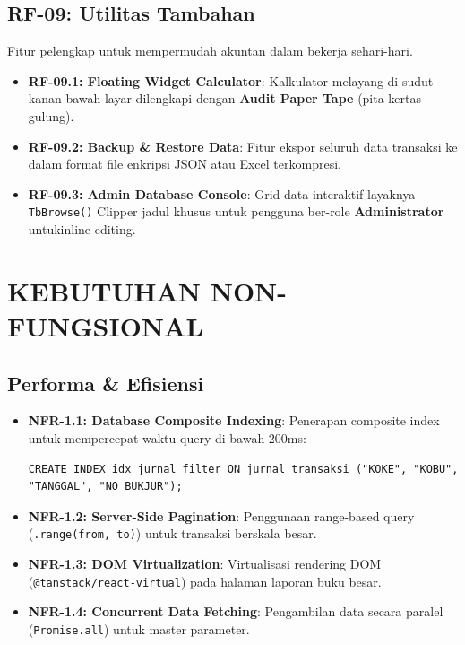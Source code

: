 \documentclass[11pt,a4paper]{article}
\begin{document}
\subsection{RF-09: Utilitas Tambahan}
Fitur pelengkap untuk mempermudah akuntan dalam bekerja sehari-hari.
\begin{itemize}
    \item \textbf{RF-09.1: Floating Widget Calculator}: Kalkulator melayang di sudut kanan bawah layar dilengkapi dengan \textbf{Audit Paper Tape} (pita kertas gulung).
    \item \textbf{RF-09.2: Backup \& Restore Data}: Fitur ekspor seluruh data transaksi ke dalam format file enkripsi JSON atau Excel terkompresi.
    \item \textbf{RF-09.3: Admin Database Console}: Grid data interaktif layaknya \texttt{TbBrowse()} Clipper jadul khusus untuk pengguna ber-role \textbf{Administrator} untukinline editing.
\end{itemize}

\newpage

\section{KEBUTUHAN NON-FUNGSIONAL}

\subsection{Performa \& Efisiensi}
\begin{itemize}
    \item \textbf{NFR-1.1: Database Composite Indexing}: Penerapan composite index untuk mempercepat waktu query di bawah 200ms:
    \begin{lstlisting}[caption={Indeks Komposit PostgreSQL untuk Jurnal Transaksi}]
CREATE INDEX idx_jurnal_filter ON jurnal_transaksi ("KOKE", "KOBU", "TANGGAL", "NO_BUKJUR");
    \end{lstlisting}
    \item \textbf{NFR-1.2: Server-Side Pagination}: Penggunaan range-based query (\texttt{.range(from, to)}) untuk transaksi berskala besar.
    \item \textbf{NFR-1.3: DOM Virtualization}: Virtualisasi rendering DOM (\texttt{@tanstack/react-virtual}) pada halaman laporan buku besar.
    \item \textbf{NFR-1.4: Concurrent Data Fetching}: Pengambilan data secara paralel (\texttt{Promise.all}) untuk master parameter.
\end{itemize}
\end{document}
